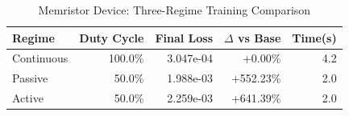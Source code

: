 \begin{table}[htbp]
\centering
\caption{Memristor Device: Three-Regime Training Comparison}
\label{tab:memristor_regimes}
\begin{tabular}{lrrrr}
\hline
Regime & Duty Cycle & Final Loss & $\Delta$ vs Base & Time(s) \\
\hline
Continuous & 100.0\% & 3.047e-04 & +0.00\% & 4.2 \\
Passive & 50.0\% & 1.988e-03 & +552.23\% & 2.0 \\
Active & 50.0\% & 2.259e-03 & +641.39\% & 2.0 \\
\hline
\end{tabular}
\end{table}
